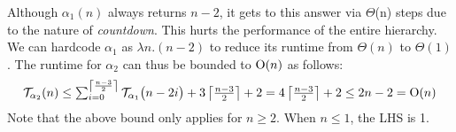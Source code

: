 
\begin{rem} \label{rem: inv-ack-hardcode}
Although $\alpha_1 (n)$ always returns $n-2$, it gets to this answer
via $\Theta$(n) steps due to the nature of \emph{countdown}.
This hurts the performance of the entire hierarchy. 
We can hardcode $\alpha_1$ as $\lambda n.(n-2)$ to reduce its runtime
from $\Theta(n)$ to $\Theta(1)$.
The runtime for $\alpha_2$ can thus be bounded to $\text{O}(n)$ as follows:
\begin{equation*}
\mathcal{T}_{\alpha_2}(n)
 \le \textstyle \sum_{i=0}^{\left\lceil \frac{n-3}{2} \right\rceil} \mathcal{T}_{\alpha_1}\big(n-2i\big) + 3\left\lceil \frac{n-3}{2} \right\rceil + 2  =  4\left\lceil \frac{n-3}{2} \right\rceil + 2
 \le 2n - 2 = \text{O}(n)
\end{equation*}
Note that the above bound only applies for $n\ge 2$. When $n\le 1$, the LHS is 1.
\end{rem}

